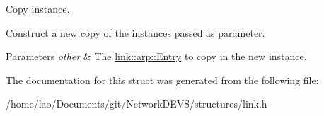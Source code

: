 Copy instance. 

Construct a new copy of the instances passed as parameter.


\begin{DoxyParams}{Parameters}
{\em other} & The \hyperlink{structlink_1_1arp_1_1Entry}{link\+::arp\+::\+Entry} to copy in the new instance. \\
\hline
\end{DoxyParams}


The documentation for this struct was generated from the following file\+:\begin{DoxyCompactItemize}
\item 
/home/lao/\+Documents/git/\+Network\+D\+E\+V\+S/structures/link.\+h\end{DoxyCompactItemize}
